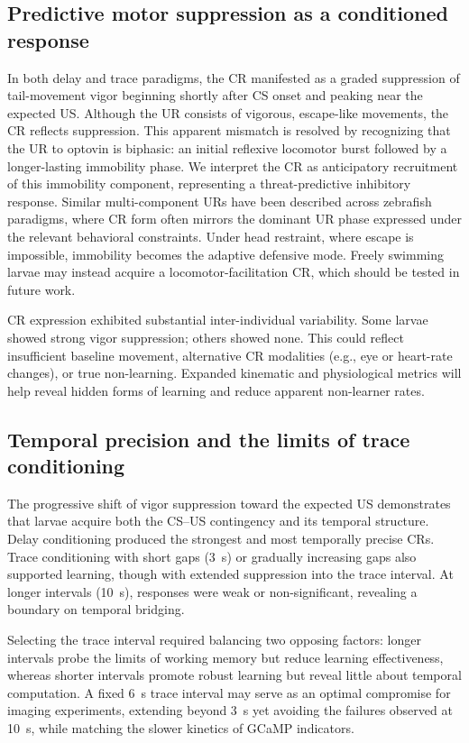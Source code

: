 \subsection{Predictive motor suppression as a conditioned response}

In both delay and trace paradigms, the CR manifested as a graded suppression of tail-movement vigor beginning shortly after CS onset and peaking near the expected US. Although the UR consists of vigorous, escape-like movements, the CR reflects suppression. This apparent mismatch is resolved by recognizing that the UR to optovin is biphasic: an initial reflexive locomotor burst followed by a longer-lasting immobility phase. We interpret the CR as anticipatory recruitment of this immobility component, representing a threat-predictive inhibitory response. Similar multi-component URs have been described across zebrafish paradigms, where CR form often mirrors the dominant UR phase expressed under the relevant behavioral constraints. Under head restraint, where escape is impossible, immobility becomes the adaptive defensive mode. Freely swimming larvae may instead acquire a locomotor-facilitation CR, which should be tested in future work.

CR expression exhibited substantial inter-individual variability. Some larvae showed strong vigor suppression; others showed none. This could reflect insufficient baseline movement, alternative CR modalities (e.g., eye or heart-rate changes), or true non-learning. Expanded kinematic and physiological metrics will help reveal hidden forms of learning and reduce apparent non-learner rates.

\subsection{Temporal precision and the limits of trace conditioning}

The progressive shift of vigor suppression toward the expected US demonstrates that larvae acquire both the CS--US contingency and its temporal structure. Delay conditioning produced the strongest and most temporally precise CRs. Trace conditioning with short gaps (3~s) or gradually increasing gaps also supported learning, though with extended suppression into the trace interval. At longer intervals (10~s), responses were weak or non-significant, revealing a boundary on temporal bridging.

Selecting the trace interval required balancing two opposing factors: longer intervals probe the limits of working memory but reduce learning effectiveness, whereas shorter intervals promote robust learning but reveal little about temporal computation. A fixed 6~s trace interval may serve as an optimal compromise for imaging experiments, extending beyond 3~s yet avoiding the failures observed at 10~s, while matching the slower kinetics of GCaMP indicators.

